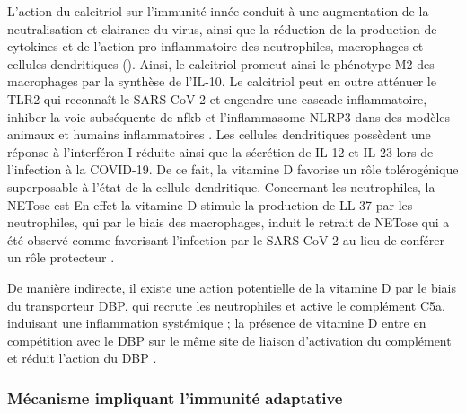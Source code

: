 \documentclass[
  a4paper,
  DIV=11,
  numbers=noendperiod,
  listof=totoc]{scrreprt}
\begin{document}
L'action du calcitriol sur l'immunité innée conduit à une augmentation
de la neutralisation et clairance du virus, ainsi que la réduction de la
production de cytokines et de l'action pro-inflammatoire des
neutrophiles, macrophages et cellules dendritiques
(). Ainsi, le calcitriol promeut ainsi le
phénotype M2 des macrophages par la synthèse de l'IL-10. Le calcitriol
peut en outre atténuer le TLR2 qui reconnaît le SARS-CoV-2 et engendre
une cascade inflammatoire, inhiber la voie subséquente de \ac{nfkb} et
l'inflammasome NLRP3 dans des modèles animaux et humains inflammatoires
\autocite{Gotelli.2022}. Les cellules dendritiques possèdent une réponse
à l'interféron I réduite ainsi que la sécrétion de IL-12 et IL-23 lors
de l'infection à la COVID-19. De ce fait, la vitamine D favorise un rôle
tolérogénique superposable à l'état de la cellule dendritique.
Concernant les neutrophiles, la NETose est En effet la vitamine D
stimule la production de LL-37 par les neutrophiles, qui par le biais
des macrophages, induit le retrait de NETose qui a été observé comme
favorisant l'infection par le SARS-CoV-2 au lieu de conférer un rôle
protecteur \autocite{Gotelli.2022}.

De manière indirecte, il existe une action potentielle de la vitamine D
par le biais du transporteur \ac{DBP}, qui recrute les neutrophiles et
active le complément C5a, induisant une inflammation systémique ; la
présence de vitamine D entre en compétition avec le \ac{DBP} sur le même
site de liaison d'activation du complément et réduit l'action du
\ac{DBP} \autocite{Speeckaert.2020,Contreras-Bolívar.2023}.

\subsubsection{Mécanisme impliquant l'immunité
adaptative}\label{muxe9canisme-impliquant-limmunituxe9-adaptative}
\end{document}
